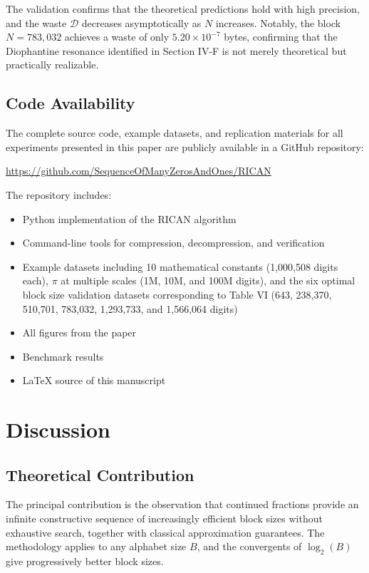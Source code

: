 \documentclass[10pt, onecolumn]{IEEEtran}
\begin{document}
The validation confirms that the theoretical predictions hold with high precision, and the waste $\mathcal{D}$ decreases asymptotically as $N$ increases. Notably, the block $N=783,032$ achieves a waste of only $5.20\times10^{-7}$ bytes, confirming that the Diophantine resonance identified in Section IV-F is not merely theoretical but practically realizable.

\subsection{Code Availability}

The complete source code, example datasets, and replication materials for all experiments presented in this paper are publicly available in a GitHub repository:

\begin{center}
\url{https://github.com/SequenceOfManyZerosAndOnes/RICAN}
\end{center}

The repository includes:
\begin{itemize}
    \item Python implementation of the RICAN algorithm
    \item Command-line tools for compression, decompression, and verification
    \item Example datasets including 10 mathematical constants (1,000,508 digits each), $\pi$ at multiple scales (1M, 10M, and 100M digits), and the six optimal block size validation datasets corresponding to Table VI (643, 238,370, 510,701, 783,032, 1,293,733, and 1,566,064 digits)
    \item All figures from the paper
    \item Benchmark results
    \item LaTeX source of this manuscript
\end{itemize}

\section{Discussion}

\subsection{Theoretical Contribution}

The principal contribution is the observation that continued fractions provide an infinite constructive sequence of increasingly efficient block sizes without exhaustive search, together with classical approximation guarantees. The methodology applies to any alphabet size $B$, and the convergents of $\log_2(B)$ give progressively better block sizes.
\end{document}
